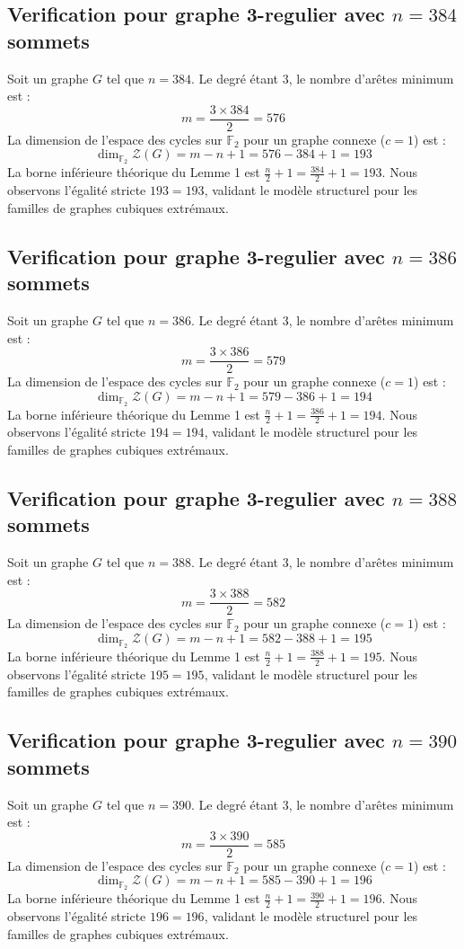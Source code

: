 \documentclass[11pt,a4paper]{article}
\begin{document}
\subsection{Verification pour graphe 3-regulier avec $n=384$ sommets}
Soit un graphe $G$ tel que $n = 384$. Le degré étant 3, le nombre d'arêtes minimum est :
$$ m = \frac{3 \times 384}{2} = 576 $$
La dimension de l'espace des cycles sur $\mathbb{F}_2$ pour un graphe connexe ($c=1$) est :
$$ \dim_{\mathbb{F}_2} \mathcal{Z}(G) = m - n + 1 = 576 - 384 + 1 = 193 $$
La borne inférieure théorique du Lemme 1 est $\frac{n}{2} + 1 = \frac{384}{2} + 1 = 193$.
Nous observons l'égalité stricte $193 = 193$, validant le modèle structurel pour les familles de graphes cubiques extrémaux.

\subsection{Verification pour graphe 3-regulier avec $n=386$ sommets}
Soit un graphe $G$ tel que $n = 386$. Le degré étant 3, le nombre d'arêtes minimum est :
$$ m = \frac{3 \times 386}{2} = 579 $$
La dimension de l'espace des cycles sur $\mathbb{F}_2$ pour un graphe connexe ($c=1$) est :
$$ \dim_{\mathbb{F}_2} \mathcal{Z}(G) = m - n + 1 = 579 - 386 + 1 = 194 $$
La borne inférieure théorique du Lemme 1 est $\frac{n}{2} + 1 = \frac{386}{2} + 1 = 194$.
Nous observons l'égalité stricte $194 = 194$, validant le modèle structurel pour les familles de graphes cubiques extrémaux.

\subsection{Verification pour graphe 3-regulier avec $n=388$ sommets}
Soit un graphe $G$ tel que $n = 388$. Le degré étant 3, le nombre d'arêtes minimum est :
$$ m = \frac{3 \times 388}{2} = 582 $$
La dimension de l'espace des cycles sur $\mathbb{F}_2$ pour un graphe connexe ($c=1$) est :
$$ \dim_{\mathbb{F}_2} \mathcal{Z}(G) = m - n + 1 = 582 - 388 + 1 = 195 $$
La borne inférieure théorique du Lemme 1 est $\frac{n}{2} + 1 = \frac{388}{2} + 1 = 195$.
Nous observons l'égalité stricte $195 = 195$, validant le modèle structurel pour les familles de graphes cubiques extrémaux.

\subsection{Verification pour graphe 3-regulier avec $n=390$ sommets}
Soit un graphe $G$ tel que $n = 390$. Le degré étant 3, le nombre d'arêtes minimum est :
$$ m = \frac{3 \times 390}{2} = 585 $$
La dimension de l'espace des cycles sur $\mathbb{F}_2$ pour un graphe connexe ($c=1$) est :
$$ \dim_{\mathbb{F}_2} \mathcal{Z}(G) = m - n + 1 = 585 - 390 + 1 = 196 $$
La borne inférieure théorique du Lemme 1 est $\frac{n}{2} + 1 = \frac{390}{2} + 1 = 196$.
Nous observons l'égalité stricte $196 = 196$, validant le modèle structurel pour les familles de graphes cubiques extrémaux.
\end{document}
